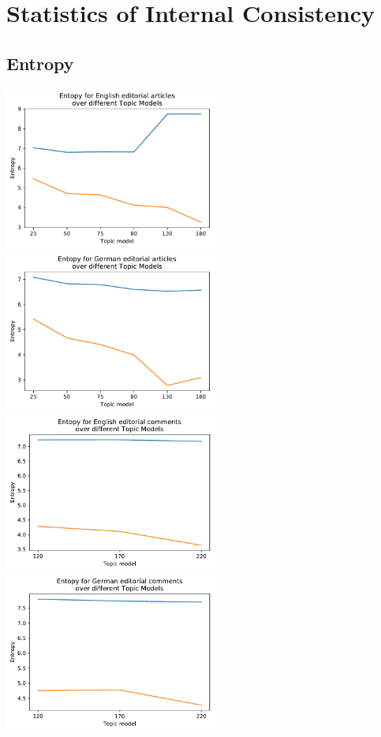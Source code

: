 \chapter{Statistics of Internal Consistency}

\section{Entropy}
\includegraphics[width=7cm]{gfx/Eval_IC/English_Editorial_Entropy.pdf}
\includegraphics[width=7cm]{gfx/Eval_IC/German_Editorial_Entropy.pdf}
\includegraphics[width=7cm]{gfx/Eval_IC/Eng_comments_Entropy.pdf}
\includegraphics[width=7cm]{gfx/Eval_IC/German_comments_Entropy.pdf}

